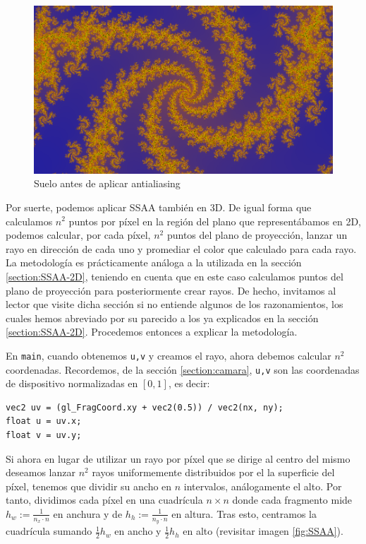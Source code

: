 \begin{figure} [ht]
    \centering
    \includegraphics[width=130mm]{img/C7/no-antialiasing.png}
    \caption{Suelo antes de aplicar antialiasing}
    \label{fig:no-antialiasing-3D}
\end{figure}

Por suerte, podemos aplicar SSAA también en 3D. De igual forma que calculamos $n^2$ puntos por píxel en la región del plano que representábamos en 2D, podemos calcular, por cada píxel, $n^2$ puntos del plano de proyección, lanzar un rayo en dirección de cada uno y promediar el color que calculado para cada rayo. La metodología es prácticamente análoga a la utilizada en la sección \ref{section:SSAA-2D}, teniendo en cuenta que en este caso calculamos puntos del plano de proyección para posteriormente crear rayos. De hecho, invitamos al lector que visite dicha sección si no entiende algunos de los razonamientos, los cuales hemos abreviado por su parecido a los ya explicados en la sección \ref{section:SSAA-2D}. Procedemos entonces a explicar la metodología.


En \verb|main|, cuando obtenemos \verb|u,v| y creamos el rayo, ahora debemos calcular $n^2$ coordenadas. Recordemos, de la sección \ref{section:camara}, \verb|u,v| son las coordenadas de dispositivo normalizadas en $[0,1]$, es decir:
\begin{lstlisting}
vec2 uv = (gl_FragCoord.xy + vec2(0.5)) / vec2(nx, ny);
float u = uv.x;
float v = uv.y;
\end{lstlisting}

Si ahora en lugar de utilizar un rayo por píxel que se dirige al centro del mismo deseamos lanzar $n^2$ rayos uniformemente distribuidos por el la superficie del píxel, tenemos que dividir su ancho en $n$ intervalos, análogamente el alto. Por tanto, dividimos cada píxel en una cuadrícula $n\times n$ donde cada fragmento mide $h_w:=\frac{1}{n_x\cdot n}$ en anchura y de $h_h:=\frac{1}{n_y \cdot n}$ en altura. Tras esto, centramos la cuadrícula sumando $\frac{1}{2}h_w$ en ancho y $\frac{1}{2}h_h$ en alto (revisitar imagen \ref{fig:SSAA}).

